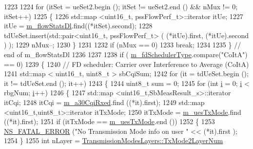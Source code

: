\begin{DoxyCode}
1223         
1224              \textcolor{keywordflow}{for} (itSet = ueSet2.begin (); itSet != ueSet2.end () && nMux != 0; itSet++)
1225                \{  
1226                  std::map <uint16\_t, pssFlowPerf\_t>::iterator itUe;
1227                  itUe = \hyperlink{classns3_1_1PssFfMacScheduler_add144474dc7bd9d89b93ff14bc8d27c9}{m\_flowStatsDl}.find((*itSet).second);
1228                  tdUeSet.insert(std::pair<uint16\_t, pssFlowPerf\_t> ( (*itUe).first, (*itUe).second ) );
1229                  nMux--;
1230                \}
1231         
1232              \textcolor{keywordflow}{if} (nMux == 0)
1233                \textcolor{keywordflow}{break};
1234         
1235            \} \textcolor{comment}{// end of m\_flowStatsDl}
1236         
1237         
1238           \textcolor{keywordflow}{if} ( \hyperlink{classns3_1_1PssFfMacScheduler_a8442a089f3cb7fcaf802fb5da9caee02}{m\_fdSchedulerType}.compare(\textcolor{stringliteral}{"CoItA"}) == 0)
1239             \{
1240               \textcolor{comment}{// FD scheduler: Carrier over Interference to Average (CoItA)}
1241               std::map < uint16\_t, uint8\_t > sbCqiSum;
1242               \textcolor{keywordflow}{for} (it = tdUeSet.begin (); it != tdUeSet.end (); it++)
1243                 \{
1244                   uint8\_t sum = 0;
1245                   \textcolor{keywordflow}{for} (\textcolor{keywordtype}{int} \hyperlink{bernuolliDistribution_8m_a6f6ccfcf58b31cb6412107d9d5281426}{i} = 0; \hyperlink{bernuolliDistribution_8m_a6f6ccfcf58b31cb6412107d9d5281426}{i} < rbgNum; \hyperlink{bernuolliDistribution_8m_a6f6ccfcf58b31cb6412107d9d5281426}{i}++)
1246                     \{
1247                       std::map <uint16\_t,SbMeasResult\_s>::iterator itCqi;
1248                       itCqi = \hyperlink{classns3_1_1PssFfMacScheduler_ab1bc511b7c55ead9b2e8ff1e0d4b0e3b}{m\_a30CqiRxed}.find ((*it).first);
1249                       std::map <uint16\_t,uint8\_t>::iterator itTxMode;
1250                       itTxMode = \hyperlink{classns3_1_1PssFfMacScheduler_a48aa1d9dc22e9c73e3c2206be76bb6cd}{m\_uesTxMode}.find ((*it).first);
1251                       \textcolor{keywordflow}{if} (itTxMode == \hyperlink{classns3_1_1PssFfMacScheduler_a48aa1d9dc22e9c73e3c2206be76bb6cd}{m\_uesTxMode}.end ())
1252                         \{
1253                           \hyperlink{group__fatal_ga5131d5e3f75d7d4cbfd706ac456fdc85}{NS\_FATAL\_ERROR} (\textcolor{stringliteral}{"No Transmission Mode info on user "} << (*it).first
      );
1254                         \}
1255                       \textcolor{keywordtype}{int} nLayer = \hyperlink{classns3_1_1TransmissionModesLayers_a31f608b7bfaa77440fe4cb85ad035329}{TransmissionModesLayers::TxMode2LayerNum}

\end{DoxyCode}
